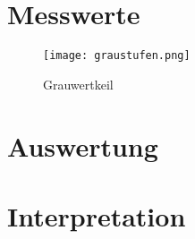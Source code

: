 \section{Messwerte}
\label{chap:VERSUCH_1_MESSWERTE}
\begin{figure}[H]
\centering
\texttt{[image: graustufen.png]}
\caption{Grauwertkeil}
\label{img:Grauwertkeil}
\end{figure}
\section{Auswertung}
\label{chap:VERSUCH_1_AUSWERTUNG}

\section{Interpretation}
\label{chap:VERSUCH_1_INTERPRETATION}